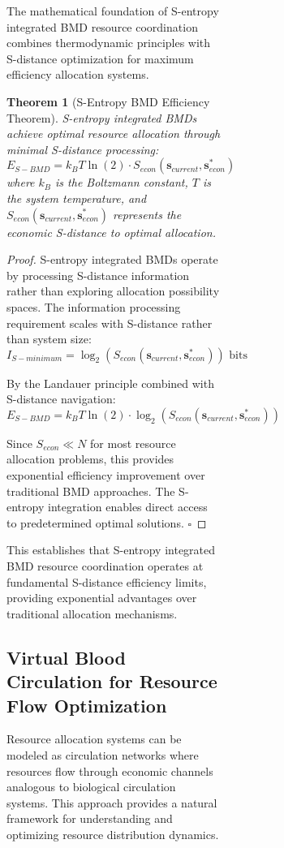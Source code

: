 \documentclass[12pt,a4paper]{article}
\newtheorem{theorem}{Theorem}
\begin{document}
\begin{figure}[H]
\begin{figure}[H]
\begin{figure}[H]
The mathematical foundation of S-entropy integrated BMD resource coordination combines thermodynamic principles with S-distance optimization for maximum efficiency allocation systems.

\begin{theorem}[S-Entropy BMD Efficiency Theorem]
S-entropy integrated BMDs achieve optimal resource allocation through minimal S-distance processing:
\begin{equation}
E_{S-BMD} = k_B T \ln(2) \cdot S_{econ}(\mathbf{s}_{current}, \mathbf{s}^*_{econ})
\end{equation}
where $k_B$ is the Boltzmann constant, $T$ is the system temperature, and $S_{econ}(\mathbf{s}_{current}, \mathbf{s}^*_{econ})$ represents the economic S-distance to optimal allocation.
\end{theorem}

\begin{proof}
S-entropy integrated BMDs operate by processing S-distance information rather than exploring allocation possibility spaces. The information processing requirement scales with S-distance rather than system size:
\begin{equation}
I_{S-minimum} = \log_2(S_{econ}(\mathbf{s}_{current}, \mathbf{s}^*_{econ})) \text{ bits}
\end{equation}

By the Landauer principle combined with S-distance navigation:
\begin{equation}
E_{S-BMD} = k_B T \ln(2) \cdot \log_2(S_{econ}(\mathbf{s}_{current}, \mathbf{s}^*_{econ}))
\end{equation}

Since $S_{econ} \ll N$ for most resource allocation problems, this provides exponential efficiency improvement over traditional BMD approaches. The S-entropy integration enables direct access to predetermined optimal solutions. $\square$
\end{proof}

This establishes that S-entropy integrated BMD resource coordination operates at fundamental S-distance efficiency limits, providing exponential advantages over traditional allocation mechanisms.

\subsection{Virtual Blood Circulation for Resource Flow Optimization}

Resource allocation systems can be modeled as circulation networks where resources flow through economic channels analogous to biological circulation systems. This approach provides a natural framework for understanding and optimizing resource distribution dynamics.


\end{figure}
\end{figure}
\end{figure}
\end{document}
